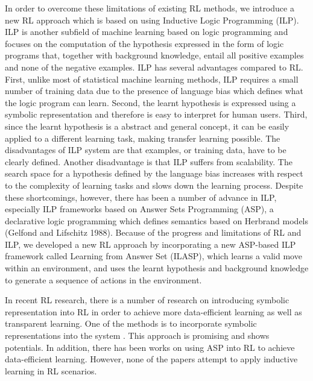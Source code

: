 In order to overcome these limitations of existing RL methods, we introduce a new RL approach which is based on using Inductive Logic Programming (ILP). 
ILP is another subfield of machine learning based on logic programming and focuses on the computation of the hypothesis expressed in the form of logic programs that, together with background knowledge, entail all positive examples and none of the negative examples. 
ILP has several advantages compared to RL. 
First, unlike most of statistical machine learning methods, ILP requires a small number of training data due to the presence of language bias which defines what the logic program can learn.
Second, the learnt hypothesis is expressed using a symbolic representation and therefore is easy to interpret for human users.
Third, since the learnt hypothesis is a abstract and general concept, it can be easily applied to a different learning task, making transfer learning possible.
The disadvantages of ILP system are that examples, or training data, have to be clearly defined.
Another disadvantage is that ILP suffers from scalability. 
The search space for a hypothesis defined by the language bias increases with respect to the complexity of learning tasks and slows down the learning process.
Despite these shortcomings, however, there has been a number of advance in ILP, especially ILP frameworks based on Answer Sets Programming (ASP), a declarative logic programming which defines semantics based on Herbrand models (Gelfond and Lifschitz 1988).
Because of the progress and limitations of RL and ILP, we developed a new RL approach by incorporating a new ASP-based ILP framework called Learning from Answer Set (ILASP), which learns a valid move within an environment, 
and uses the learnt hypothesis and background knowledge to generate a sequence of actions in the environment. 

In recent RL research, there is a number of research on introducing symbolic representation into RL in order to achieve more data-efficient learning as well as transparent learning. 
One of the methods is to incorporate symbolic representations into the system \cite{Garnelo2016}. This approach is promising and shows potentials.
In addition, there has been works on using ASP into RL to achieve data-efficient learning.
However, none of the papers attempt to apply inductive learning in RL scenarios. 

